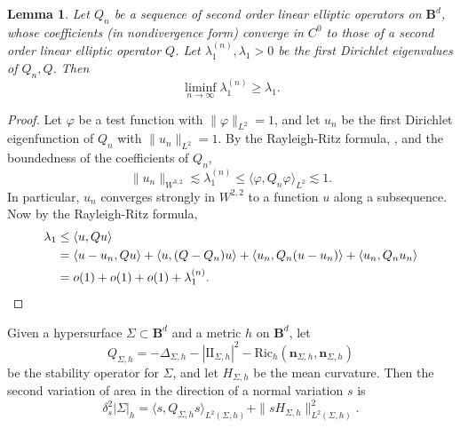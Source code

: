 \documentclass[reqno,11pt]{amsart}
\newcommand{\Ball}{\mathbf{B}}
\newcommand{\Two}{\mathrm{I\!I}}
\newcommand{\normal}{\mathbf n}
\newcommand{\Ric}{\mathrm{Ric}}
\newtheorem{lemma}[theorem]{Lemma}
\theoremstyle{definition}
\numberwithin{equation}{section}
\begin{document}
\begin{lemma}
Let $Q_n$ be a sequence of second order linear elliptic operators on $\Ball^d$, whose coefficients (in nondivergence form) converge in $C^0$ to those of a second order linear elliptic operator $Q$.
Let $\lambda_1^{(n)}, \lambda_1 > 0$ be the first Dirichlet eigenvalues of $Q_n, Q$.
Then 
\begin{equation}\label{spectral gap}
\liminf_{n \to \infty} \lambda_1^{(n)} \geq \lambda_1.
\end{equation}
\end{lemma}
\begin{proof}
Let $\varphi$ be a test function with $\|\varphi\|_{L^2} = 1$, and let $u_n$ be the first Dirichlet eigenfunction of $Q_n$ with $\|u_n\|_{L^2} = 1$.
By the Rayleigh-Ritz formula, \cite[Theorem 8.13]{gilbarg2015elliptic}, and the boundedness of the coefficients of $Q_n$,
$$\|u_n\|_{W^{3, 2}} \lesssim \lambda_1^{(n)} \leq \langle \varphi, Q_n \varphi\rangle_{L^2} \lesssim 1.$$
In particular, $u_n$ converges strongly in $W^{2, 2}$ to a function $u$ along a subsequence.
Now by the Rayleigh-Ritz formula,
\begin{align*}
\lambda_1 &\leq \langle u, Qu\rangle \\
&= \langle u - u_n, Qu\rangle + \langle u, (Q - Q_n) u\rangle + \langle u_n, Q_n(u - u_n)\rangle + \langle u_n, Q_n u_n\rangle \\
&= o(1) + o(1) + o(1) + \lambda_1^{(n)}. \qedhere
\end{align*}
\end{proof}

Given a hypersurface $\Sigma \subset \Ball^d$ and a metric $h$ on $\Ball^d$, let
\begin{equation}\label{stability formula}
Q_{\Sigma, h} = -\Delta_{\Sigma, h} - |\Two_{\Sigma, h}|^2 - \Ric_h(\normal_{\Sigma, h}, \normal_{\Sigma, h})
\end{equation}
be the stability operator for $\Sigma$, and let $H_{\Sigma, h}$ be the mean curvature.
Then the second variation of area in the direction of a normal variation $s$ is \cite[Chapter 1, \S8.1]{colding2011course}
\begin{equation}\label{second variation formula}
\delta^2_s |\Sigma|_h = \langle s, Q_{\Sigma, h} s\rangle_{L^2(\Sigma, h)} + \|sH_{\Sigma, h}\|_{L^2(\Sigma, h)}^2.
\end{equation}
\end{document}
